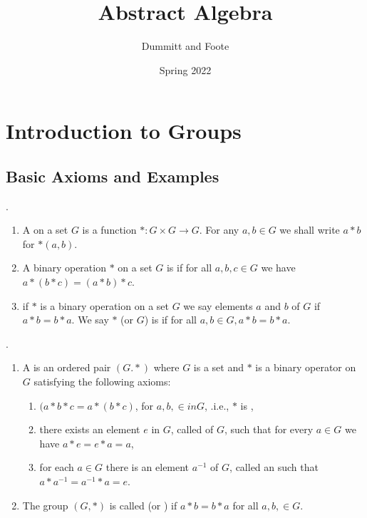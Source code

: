 \documentclass[10pt,a4paper]{report}
\title{Abstract Algebra}
\author{Dummitt and Foote}
\date{Spring 2022}
\begin{document}
\maketitle

\tableofcontents

\chapter{Introduction to Groups}
\section{Basic Axioms and Examples}

\begin{definition}.
\begin{enumerate}
	\item A  on a set $G$ is a function  $*: G \times G \to G$.  For any $a,b \in G$ we shall write $a * b$ for $*(a,b)$.
	\item A binary operation $*$ on a set $G$ is  if for all $a, b,c \in G$ we have $a* (b*c)=(a*b)*c$.
	\item if $*$ is a binary operation on a set $G$ we say elements $a$ and $b$ of $G$  if $a*b=b*a$.  We say $*$ (or $G$) is  if for all $a, b\in G, a*b = b*a$.
\end{enumerate}
\end{definition}

\begin{definition}[Group].
\begin{enumerate}
	\item A  is an ordered pair $(G.*)$ where $G$ is a set and $*$ is a binary operator on $G$ satisfying the following axioms:
	
	\begin{enumerate}
		\item $(a*b*c=a*(b*c)$, for $ a,b,\in in G$, .i.e., $*$ is , 
		\item there exists an element $e$ in $G$, called  of $G$, such that for every $a \in G$ we have $a*e=e*a = a$,
		\item for each $a \in G$ there is an element $a^{-1}$ of $G$, called an  such that $a*a^{-1}=a^{-1}*a=e$.
	\end{enumerate}
	
	\item The group $(G,*)$ is called  (or ) if $a*b=b*a$ for all $a,b, \in G$.
\end{enumerate}

\end{definition}
\end{document}

